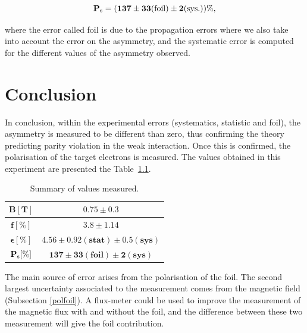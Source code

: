 \documentclass[10pt,swedish, openany]{book}
\begin{document}
\begin{equation*}
    \mathbf{ P_{\rm s} = (137 \pm 33 ({\rm foil}) \pm 2 ({\rm sys.}))\%},
\end{equation*}

where the error called foil is due to the propagation errors where we also take into account the error on the asymmetry, and the systematic error is computed for the different values of the asymmetry observed.


\chapter{Conclusion}
\label{chapter:Conclusion}

In conclusion, within the experimental errors (systematics, statistic and foil), the asymmetry is measured to be different than zero, thus confirming the theory predicting parity violation in the weak interaction. Once this is confirmed, the polarisation of the target electrons is measured. The values obtained in this experiment are presented the Table~\ref{tab:summary}.

\begin{table}[H]
    \centering
    \begin{tabular}{|c |c|}
    \hline
         $\mathbf{B [T]}$ & $\mathbf{0.75 \pm 0.3}$ \\
         \hline
         $\mathbf{f [\%]}$ & $\mathbf{3.8 \pm 1.14}$\\
         \hline
         $\mathbf{\epsilon [\%]}$ & $\mathbf{4.56 \pm 0.92 (stat) \pm 0.5 (sys)}$\\
         \hline
        $\mathbf{P_{\rm s} [\%]}$ & $\mathbf{137 \pm 33(foil) \pm 2(sys)}$\\ 
        \hline
    \end{tabular}
    \caption{Summary of values measured.}
    \label{tab:summary}
\end{table}

The main source of error arises from the polarisation of the foil. The second largest uncertainty associated to the measurement comes from the magnetic field (Subsection \ref{polfoil}). A flux-meter could be used to improve the measurement of the magnetic flux with and without the foil, and the difference between these two measurement will give the foil contribution.\\



\pagebreak
\end{document}
